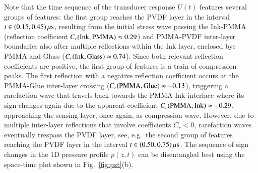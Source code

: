 \documentclass[5p,times,twocolumn]{elsarticle}
\begin{document}
Note that the time sequence of the transducer response $U(t)$ features several
groups of features: the first group reaches the PVDF layer in the interval
$t\in (0.15,0.45)\,{\rm{\mu s}}$, resulting from the initial stress wave
passing the Ink-PMMA (reflection coefficient $C_r({\rm{Ink}},{\rm{PMMA}})
\approx 0.29$) and PMMA-PVDF inter-layer boundaries also after multiple
reflections within the Ink layer, enclosed bye PMMA and Glass
($C_r({\rm{Ink}},{\rm{Glass}}) \approx 0.74$). Since both relevant reflection
coefficients are positive, the first group of features is a train of
compression peaks. The first reflection with a negative reflection coefficient
occurs at the PMMA-Glue inter-layer crossing ($C_r({\rm{PMMA}},{\rm{Glue}})
\approx -0.13$), triggering a rarefaction wave that travels back towards the
PMMA-Ink interface where its sign changes again due to the apparent coefficient
$C_r({\rm{PMMA}},{\rm{Ink}}) \approx -0.29$, approaching the sensing layer,
once again, as compression wave. However, due to multiple inter-layer
reflections that involve coefficients $C_r<0$, rarefaction waves eventually
trespass the PVDF layer, see, e.g.\ the second group of features reaching the
PVDF layer in the interval $t\in (0.50,0.75)\,{\rm{\mu s}}$. The sequence of
sign changes in the $1$D pressure profile $p(z,t)$ can be disentangled best
using the space-time plot shown in Fig.\ \ref{fig:pzt}(b).
\end{document}
